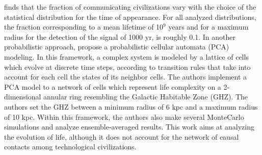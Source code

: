 \documentclass[crop]{CSLB}
\begin{document}
%
\citet{balbi_impact_2018} finds that the fraction of communicating
civilizations vary with the choice of the statistical distribution for
the time of appearance. For all analyzed distributions, the fraction
corresponding to a mean lifetime of 10$^9$ years and for a maximum
radius for the detection of the signal of 1000 yr, is roughly 0.1.
%
In another probabilistic approach,
\citet{vukotic_astrobiological_2012} propose a probabilistic cellular
automata (PCA) modeling. In this framework, a complex system is
modeled by a lattice of cells which evolve at discrete time steps,
according to transition rules that take into account for each cell the
states of its neighbor cells.
%
The authors implement a PCA model to a network of cells which
represent life complexity on a 2-dimensional annular ring resembling
the Galactic Habitable Zone (GHZ). 
%
The authors set the GHZ between a minimum radius of 6 kpc and a
maximum radius of 10 kpc. Within this framework, the authors also make
several MonteCarlo simulations and analyze ensemble-averaged results.
%
This work aims at analyzing the evolution of life, although it does
not account for the network of causal contacts among technological
civilizations.
\end{document}
